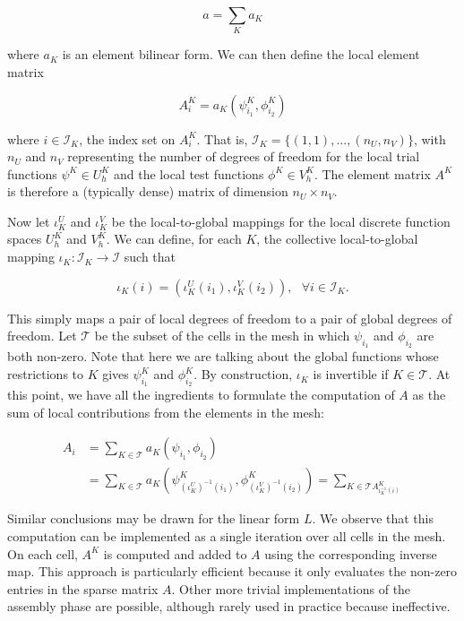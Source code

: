 \begin{equation}
a = \sum_{K} a_K
\end{equation}

where $a_K$ is an element bilinear form. We can then define the local element matrix

\begin{equation}
A_i^K = a_K (\psi_{i_1}^K, \phi_{i_2}^K)
\end{equation}

where $i \in \mathcal{I}_K$, the index set on $A_i^K$. That is, $\mathcal{I}_K = \lbrace (1,1), ..., (n_U, n_V) \rbrace$, with $n_U$ and $n_V$ representing the number of degrees of freedom for the local trial functions $\psi^K \in U_h^K$ and the local test functions $\phi^K \in V_h^K$. The element matrix $A^K$ is therefore a (typically dense) matrix of dimension $n_U \times n_V$.

Now let $\iota_K^U$ and $\iota_K^V$ be the local-to-global mappings for the local discrete function spaces $U_h^K$ and $V_h^K$. We can define, for each $K$, the collective local-to-global mapping $\iota_K : \mathcal{I}_K \rightarrow \mathcal{I}$ such that

\begin{equation}
\iota_K (i) = (\iota_K^U(i_1), \iota_K^V(i_2)),\ \ \ \forall i \in \mathcal{I}_K.
\end{equation}

This simply maps a pair of local degrees of freedom to a pair of global degrees of freedom. Let $\mathcal{T}$ be the subset of the cells in the mesh in which $\psi_{i_1}$ and $\phi_{i_2}$ are both non-zero. Note that here we are talking about the global functions whose restrictions to $K$ gives $\psi_{i_1}^K$ and $\phi_{i_2}^K$. By construction, $\iota_K$ is invertible if $K \in \mathcal{T}$. At this point, we have all the ingredients to formulate the computation of $A$ as the sum of local contributions from the elements in the mesh:

\begin{equation}
\begin{split}
A_i & = \sum_{K \in \mathcal{T}} a_K (\psi_{i_1},\phi_{i_2}) \\
& = \sum_{K \in \mathcal{T}} a_K(\psi_{(\iota_K^U)^{-1}(i_1)}^K, \phi_{(\iota_K^V)^{-1}(i_2)}^K) = \sum_{K \in \mathcal{T} A_{\iota_K^{-1}(i)}^K}
\end{split}
\end{equation} 

Similar conclusions may be drawn for the linear form $L$. We observe that this computation can be implemented as a single iteration over all cells in the mesh. On each cell, $A^K$ is computed and added to $A$ using the corresponding inverse map. This approach is particularly efficient because it only evaluates the non-zero entries in the sparse matrix $A$. Other more trivial implementations of the assembly phase are possible, although rarely used in practice because ineffective. 

